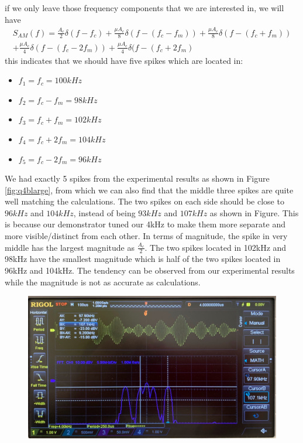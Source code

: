 \documentclass[11pt]{article}
\begin{document}
\begin{enumerate}[label=(\alph*)]
if we only leave those frequency components that we are interested in, we will have
\begin{align*}
    S_{AM}(f) = \frac{A_c}{2} \delta(f-f_c)+ \frac{\mu A_c}{8}\delta (f-(f_c-f_m)) + \frac{\mu A_c}{8} \delta (f-(f_c+f_m)) \\ +\frac{\mu A_c}{4}\delta (f-(f_c-2f_m)) +\frac{\mu A_c}{4} \delta (f-(f_c+2f_m) 
\end{align*}
this indicates that we should have five spikes which are located in:
\begin{multicols}{3}
\begin{itemize}
    \item $f_1=f_c=100kHz$
    \item $f_2=f_c-f_m=98kHz$
    \item $f_3=f_c+f_m=102kHz$
    \item $f_4=f_c+2f_m=104kHz$
    \item $f_5=f_c-2f_m=96kHz$
\end{itemize}
\end{multicols}
We had exactly 5 spikes from the experimental results as shown in Figure \ref{fig:q4blarge}, from which we can also find that the middle three spikes are quite well matching the calculations. The two spikes on each side should be close to $96kHz$ and $104kHz$, instead of being $93kHz$ and $107kHz$ as shown in Figure. This is because our demonstrator tuned our 4kHz to make them more separate and more visible/distinct from each other. In terms of magnitude, the spike in very middle has the largest magnitude as $\frac{A_c}{2}$. The two spikes located in 102kHz and 98kHz have the smallest magnitude which is half of the two spikes located in 96kHz and 104kHz. The tendency can be observed from our experimental results while the magnitude is not as accurate as calculations. 
\begin{figure}[H]
    \centering
    \includegraphics[scale = 0.15]{Q4bLmu.jpg}

\end{figure}
\end{enumerate}
\end{document}
